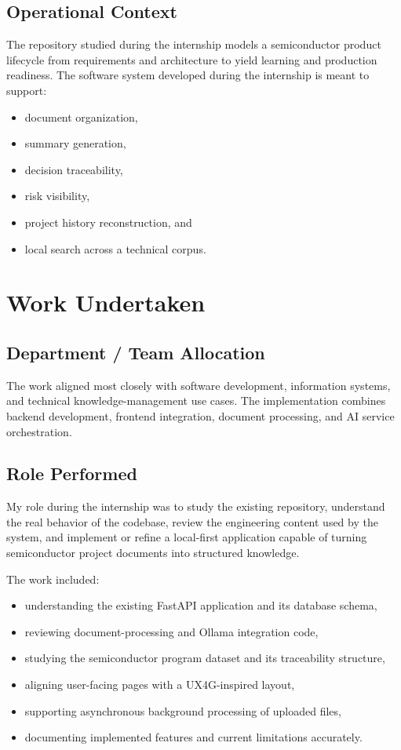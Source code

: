 \documentclass[12pt, a4paper]{article}
\begin{document}
\subsection{Operational Context}
The repository studied during the internship models a semiconductor product lifecycle from requirements and architecture to yield learning and production readiness. The software system developed during the internship is meant to support:
\begin{itemize}
\item document organization,
\item summary generation,
\item decision traceability,
\item risk visibility,
\item project history reconstruction, and
\item local search across a technical corpus.
\end{itemize}

\section{Work Undertaken}
\subsection{Department / Team Allocation}
The work aligned most closely with software development, information systems, and technical knowledge-management use cases. The implementation combines backend development, frontend integration, document processing, and AI service orchestration.

\subsection{Role Performed}
My role during the internship was to study the existing repository, understand the real behavior of the codebase, review the engineering content used by the system, and implement or refine a local-first application capable of turning semiconductor project documents into structured knowledge.

The work included:
\begin{itemize}
\item understanding the existing FastAPI application and its database schema,
\item reviewing document-processing and Ollama integration code,
\item studying the semiconductor program dataset and its traceability structure,
\item aligning user-facing pages with a UX4G-inspired layout,
\item supporting asynchronous background processing of uploaded files,
\item documenting implemented features and current limitations accurately.
\end{itemize}
\end{document}
